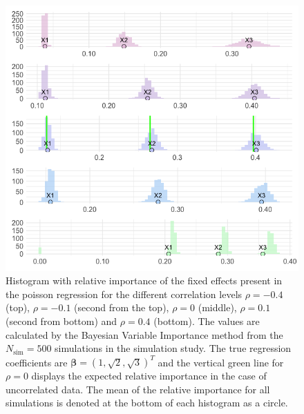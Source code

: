 \begin{figure}[H]
  \centering
  \includegraphics[width=1.1\linewidth]{Figures/Simulation study/Fixed_combined_poisson_test.png}
  \caption{Histogram with relative importance of the fixed effects present in the poisson regression for the different correlation levels $\rho=-0.4$ (top), $\rho=-0.1$ (second from the top), $\rho=0$ (middle), $\rho=0.1$ (second from bottom) and $\rho=0.4$ (bottom). The values are calculated by the Bayesian Variable Importance method from the $N_{\text{sim}}=500$ simulations in the simulation study. The true regression coefficients are $\boldsymbol{\beta}=(1, \sqrt{2}, \sqrt{3})^T$ and the vertical green line for $\rho=0$ displays the expected relative importance in the case of uncorrelated data. The mean of the relative importance for all simulations is denoted at the bottom of each histogram as a circle.}
  \label{fig:fixed_combined_poisson}
\end{figure}

